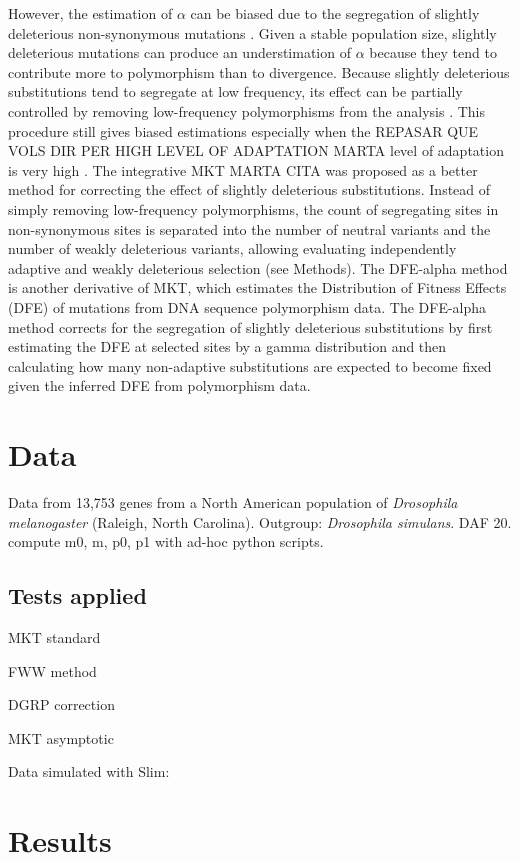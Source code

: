 \documentclass[a4paper]{article}
\begin{document}
However, the estimation of $\alpha$ can be biased due to the segregation of slightly deleterious non-synonymous mutations \citep{Eyre-Walker2002}. Given a stable population size, slightly deleterious mutations can produce an understimation of $\alpha$ because they tend to contribute more to polymorphism than to divergence. Because slightly deleterious substitutions tend to segregate at low frequency, its effect can be partially controlled by removing low-frequency polymorphisms from the analysis \citep{Fay2001}. This procedure still gives biased estimations especially when the REPASAR QUE VOLS DIR PER HIGH LEVEL OF ADAPTATION MARTA level of adaptation is very high \citep{Charlesworth2008}. The integrative MKT \citep{Mackay2012a} MARTA CITA was proposed as a better method for correcting the effect of slightly deleterious substitutions. Instead of simply removing low-frequency polymorphisms, the count of segregating sites in non-synonymous sites is separated into the number of neutral variants and the number of weakly deleterious variants, allowing evaluating independently adaptive and weakly deleterious selection (see Methods). The DFE-alpha method is another derivative of MKT, which estimates the Distribution of Fitness Effects (DFE) of mutations from DNA sequence polymorphism data. The DFE-alpha method corrects for the segregation of slightly deleterious substitutions by first estimating the DFE at selected sites by a gamma distribution and then calculating how many non-adaptive substitutions are expected to become fixed given the inferred DFE from polymorphism data.

\section{Data}
Data from 13,753 genes from a North American population of \textit{Drosophila melanogaster} (Raleigh, North Carolina). Outgroup: \textit{Drosophila simulans}. DAF 20. compute m0, m, p0, p1 with ad-hoc python scripts.

\subsection{Tests applied}

MKT standard

FWW method

DGRP correction

MKT asymptotic


Data simulated with Slim:

\section{Results}
\end{document}

